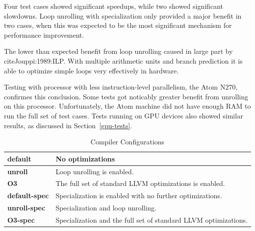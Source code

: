 \documentclass{acm_proc_article-sp}
\begin{document}

Four test cases showed
significant speedups, while two showed significant slowdowns. Loop unrolling
with specialization only provided a major benefit in two cases, when this was
expected to be the most significant mechanism for performance improvement.

The lower than expected benefit from loop unrolling caused in large part by cite{Jouppi:1989:ILP}. With multiple
arithmetic units and branch prediction it is able to optimize simple loops very
effectively in hardware.

Testing with processor with less instruction-level parallelism, the Atom N270,
confirmes this conclusion. Some tests got noticably greater benefit from
unrolling on this processor. Unfortunately, the Atom machine did not have
enough RAM to run the full set of test cases. Tests running on GPU devices also
showed similar results, as discussed in Section~\ref{gpu-tests}.

\begin{table}
\renewcommand{\arraystretch}{1.2}
\begin{tabular}{ l | p{2in} }
    {\bf default} & No optimizations \\
    \hline
    {\bf unroll} & Loop unrolling is enabled. \\
    \hline
    {\bf O3} & The full set of standard LLVM optimizations is enabled. \\
    \hline
    {\bf default-spec} & Specialization is enabled with no further optimizations. \\
    \hline
    {\bf unroll-spec} & Specialization and loop unrolling. \\
    \hline
    {\bf O3-spec} & Specialization and the full set of standard LLVM optimizations. \\
\end{tabular}
\caption{\label{test-configs} Compiler Configurations}
\end{table}
\end{document}

